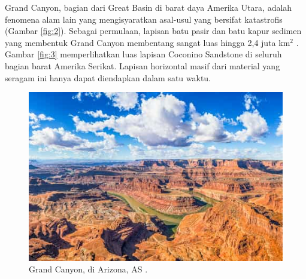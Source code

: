 \documentclass[10pt,twocolumn,letterpaper]{article}
\begin{document}
Grand Canyon, bagian dari Great Basin di barat daya Amerika Utara, adalah fenomena alam lain yang mengisyaratkan asal-usul yang bersifat katastrofis (Gambar \ref{fig:2}). Sebagai permulaan, lapisan batu pasir dan batu kapur sedimen yang membentuk Grand Canyon membentang sangat luas hingga 2,4 juta km$^2$ \cite{21}. Gambar \ref{fig:3} memperlihatkan luas lapisan Coconino Sandstone di seluruh bagian barat Amerika Serikat. Lapisan horizontal masif dari material yang seragam ini hanya dapat diendapkan dalam satu waktu.

\begin{figure}[b]
\begin{center}
   \includegraphics[width=1\linewidth]{grand-canyon.jpg}
\end{center}
   \caption{Grand Canyon, di Arizona, AS \cite{49}.}
\label{fig:2}
\label{fig:onecol}
\end{figure}
\end{document}
